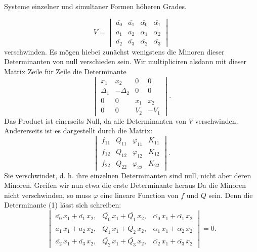Systeme einzelner und simultaner Formen höheren Grades.

\[
V = \begin{vmatrix}
\overline{a_0} & \overline{a_1} & \overline{\alpha_0} & \overline{\alpha_1} \\
\overline{a_1} & \overline{a_2} & \overline{\alpha_1} & \overline{\alpha_2} \\
\overline{a_2} & \overline{a_3} & \overline{\alpha_2} & \overline{\alpha_3}
\end{vmatrix}
\]
verschwinden. Es mögen hiebei zunächst wenigstens die Minoren dieser Determinanten von null verschieden sein. Wir multipliciren alsdann mit dieser Matrix Zeile für Zeile die Determinante
\[
\begin{vmatrix}
x_1 & x_2 & 0 & 0 \\
\Delta_1 & -\Delta_2 & 0 & 0 \\
0 & 0 & x_1 & x_2 \\
0 & 0 & V_2 & -V_1
\end{vmatrix}.
\]
Das Product ist einerseits Null, da alle Determinanten von $V$ verschwinden. Andererseits ist es dargestellt durch die Matrix:
\[
\begin{vmatrix}
f_{11} & Q_{11} & \varphi_{11} & K_{11} \\
f_{12} & Q_{12} & \varphi_{12} & K_{12} \\
f_{22} & Q_{22} & \varphi_{22} & K_{22}
\end{vmatrix}.
\]
Sie verschwindet, d. h. ihre einzelnen Determinanten sind null, nicht aber deren Minoren. Greifen wir nun etwa die erste Determinante heraus
Da die Minoren nicht verschwinden, so muss $\varphi$ eine lineare Function von $f$ und $Q$ sein. Denn die Determinante (1) lässt sich schreiben:
\[
\begin{vmatrix}
\overline{a_0}\,x_1 + \overline{a_1}\,x_2, & \overline{Q_0}\,x_1 + \overline{Q_1}\,x_2, & \overline{\alpha_0}\,x_1 + \overline{\alpha_1}\,x_2 \\
\overline{a_1}\,x_1 + \overline{a_2}\,x_2, & \overline{Q_1}\,x_1 + \overline{Q_2}\,x_2, & \overline{\alpha_1}\,x_1 + \overline{\alpha_2}\,x_2 \\
\overline{a_2}\,x_1 + \overline{a_3}\,x_2, & \overline{Q_2}\,x_1 + \overline{Q_3}\,x_2, & \overline{\alpha_2}\,x_1 + \overline{\alpha_3}\,x_2
\end{vmatrix} = 0.
\]

